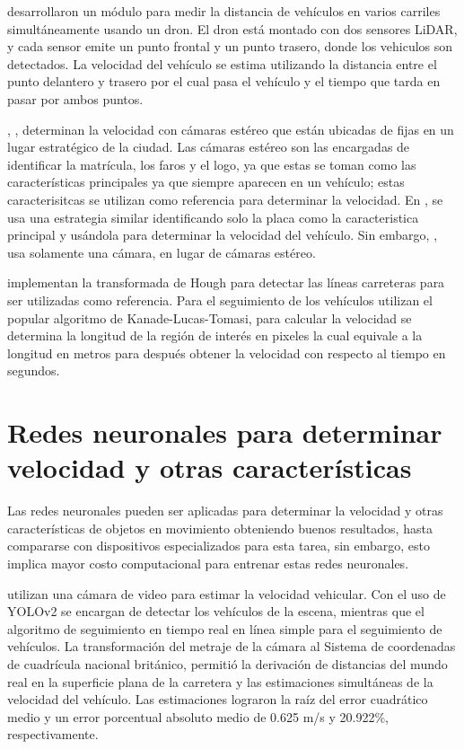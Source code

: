 \citeauthor{lee2021Study} desarrollaron un módulo para medir la distancia de vehículos en varios carriles simultáneamente usando un dron. El dron está montado con dos sensores LiDAR, y cada sensor emite un punto frontal y un punto trasero, donde los vehiculos son detectados. La velocidad del vehículo se estima utilizando la distancia entre el punto delantero y trasero por el cual pasa el vehículo y el tiempo que tarda en pasar por ambos puntos.


\citeauthor{yang2021Robust}, \citeauthor{yang2021Improved}, determinan la velocidad con cámaras estéreo que están ubicadas de fijas en un lugar estratégico de la ciudad. Las cámaras estéreo son las encargadas de identificar la matrícula, los faros y el logo, ya que estas se toman como las características principales ya que siempre aparecen en un vehículo; estas caracterisitcas se utilizan como referencia para determinar la velocidad. En \citeauthor{vakili2020Single}, se usa una estrategia similar identificando solo la placa como la caracteristica principal y usándola para determinar la velocidad del vehículo. Sin embargo, \citeauthor{vakili2020Single}, usa solamente una cámara, en lugar de cámaras estéreo.


\citeauthor{bevilacqua2016Egomotion} implementan la transformada de Hough para detectar las líneas carreteras para ser utilizadas como referencia. Para el seguimiento de los vehículos utilizan el popular algoritmo de Kanade-Lucas-Tomasi, para calcular la velocidad se determina la longitud de la región de interés en pixeles la cual equivale a la longitud en metros para después obtener la velocidad con respecto al tiempo en segundos.


\section{Redes neuronales para determinar velocidad y otras características}

Las redes neuronales pueden ser aplicadas para determinar la velocidad y otras características de objetos en movimiento obteniendo buenos resultados, hasta compararse con dispositivos especializados para esta tarea, sin embargo, esto implica mayor costo computacional para entrenar estas redes neuronales.


\citeauthor{bell2020Accurate} utilizan una cámara de video para estimar la velocidad vehicular. Con el uso de YOLOv2 se encargan de detectar los vehículos de la escena, mientras que el algoritmo de seguimiento en tiempo real en línea simple para el seguimiento de vehículos. La transformación del metraje de la cámara al Sistema de coordenadas de cuadrícula nacional británico, permitió la derivación de distancias del mundo real en la superficie plana de la carretera y las estimaciones simultáneas de la velocidad del vehículo. Las estimaciones lograron la raíz del error cuadrático medio y un error porcentual absoluto medio de 0.625 m/s y 20.922\%, respectivamente.


